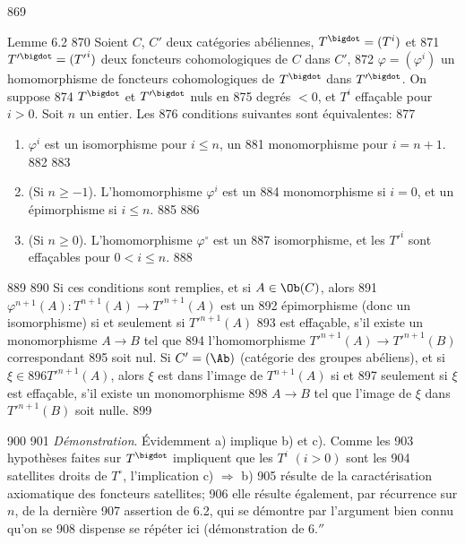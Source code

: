    869	\begin{enonce*}{Lemme 6.2}
   870	Soient $C$, $C'$ deux catégories abéliennes, $T^{\bigdot}=(T^{i})$ et
   871	$T'^{\bigdot}=({T'}^{i})$ deux foncteurs cohomologiques de $C$ dans $C'$,
   872	$\varphi=(\varphi^{i})$ un homomorphisme de foncteurs	cohomologiques de $T^{\bigdot}$ dans $T'^{\bigdot}$. On suppose 
   874	$T^{\bigdot}$ et $T'^{\bigdot}$ nuls en
   875	degrés $<0$, et $T^{i}$ effaçable pour $i>0$. Soit $n$ un entier. Les
   876	conditions suivantes sont équivalentes:
   877	\begin{enumerate}
   878	\renewcommand{\theenumi}{\alph{enumi}}
   879	\renewcommand{\labelenumi}{\theenumi)}
   880	\item $\varphi^{i}$ est un isomorphisme pour $i\leq n$, un
   881	  monomorphisme pour $i=n+1$.
   882	
   883	\item (Si $n\geq -1$). L'homomorphisme $\varphi^{i}$ est un
   884	  monomorphisme si $i=0$, et un épimorphisme si $i\leq n$.
   885	
   886	\item (Si $n\geq 0$). L'homomorphisme $\varphi^{\circ}$ est un
   887	  isomorphisme, et les ${T'}^{i}$ sont effaçables pour $0<i\leq n$.
   888	\end{enumerate}
   889	
   890	Si ces conditions sont remplies, et si $A\in \Ob(C)$, alors
   891	$\varphi^{n+1}(A):T^{n+1}(A)\rightarrow {T'}^{n+1}(A)$ est un
   892	épimorphisme (donc un isomorphisme) si et seulement si ${T'}^{n+1}(A)$
   893	est effaçable, \ie s'il existe un monomorphisme $A\rightarrow B$ tel que
   894	l'homomorphisme ${T'}^{n+1}(A)\rightarrow {T'}^{n+1}(B)$ correspondant
   895	soit nul. Si $C'=(\Ab)$ (catégorie des groupes abéliens), et si $\xi\in
   896	{T'}^{n+1}(A)$, alors $\xi$ est dans l'image de $T^{n+1}(A)$ si et
   897	seulement si $\xi$ est effaçable, \ie s'il existe un monomorphisme
   898	$A\rightarrow B$ tel que l'image de $\xi$ dans ${T'}^{n+1}(B)$ soit nulle.
   899	\end{enonce*}
   900	
   901		\emph{Démonstration}. Évidemment a) implique b) et c). Comme les
   903	hypothèses faites sur $T^{\bigdot}$ impliquent que les $T^{i}$ $(i>0)$ sont les
   904	satellites droits de $T^{\circ}$, l'implication c) $\Rightarrow$ b)
   905	résulte de la caractérisation axiomatique des foncteurs satellites;
   906	elle résulte également, par récurrence sur $n$, de la dernière
   907	assertion de 6.2, qui se démontre par l'argument bien connu qu'on se
   908	dispense se répéter ici (\cf démonstration de 6.$''$
